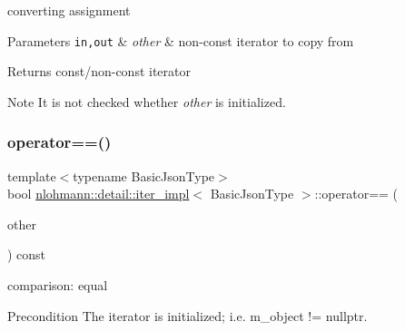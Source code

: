 converting assignment 


\begin{DoxyParams}[1]{Parameters}
\mbox{\tt in,out}  & {\em other} & non-\/const iterator to copy from \\
\hline
\end{DoxyParams}
\begin{DoxyReturn}{Returns}
const/non-\/const iterator 
\end{DoxyReturn}
\begin{DoxyNote}{Note}
It is not checked whether {\itshape other} is initialized. 
\end{DoxyNote}
\mbox{\label{classnlohmann_1_1detail_1_1iter__impl_a2b592605b63ae7f5401996ffa3b14393}} 
\subsubsection{\texorpdfstring{operator==()}{operator==()}}
{\footnotesize\ttfamily template$<$typename Basic\+Json\+Type$>$ \\
bool \mbox{\hyperlink{classnlohmann_1_1detail_1_1iter__impl}{nlohmann\+::detail\+::iter\+\_\+impl}}$<$ Basic\+Json\+Type $>$\+::operator== (\begin{DoxyParamCaption}\item[{const \mbox{\hyperlink{classnlohmann_1_1detail_1_1iter__impl}{iter\+\_\+impl}}$<$ Basic\+Json\+Type $>$ \&}]{other }\end{DoxyParamCaption}) const\hspace{0.3cm}{\ttfamily [inline]}}



comparison\+: equal 

\begin{DoxyPrecond}{Precondition}
The iterator is initialized; i.\+e. {\ttfamily m\+\_\+object != nullptr}. 
\end{DoxyPrecond}
\mbox{\label{classnlohmann_1_1detail_1_1iter__impl_aaf3620b8dfa4bed8a9ac2b51dd55dbd7}} 
